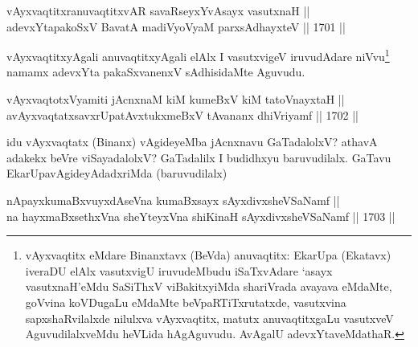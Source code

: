 \begin{shl}
vAyxvaqtitxranuvaqtitxvAR savaRseyxYvAsayx vasutxnaH || \\
adevxYtapakoSxV BavatA madiVyoV\s yaM parxsAdhayxteV \hfill || 1701 ||  
\end{shl}

\begin{artha}
vAyxvaqtitxyAgali anuvaqtitxyAgali elAlx I vasutxvigeV iruvudAdare niVvu\footnote{vAyxvaqtitx eMdare Binanxtavx (BeVda) anuvaqtitx: EkarUpa (Ekatavx) iveraDU elAlx vasutxvigU iruvudeMbudu iSaTxvAdare `asayx vasutxnaH'eMdu SaSiThxV viBakitxyiMda shariVrada avayava eMdaMte, goVvina koVDugaLu eMdaMte beVpaRTiTxrutatxde, vasutxvina sapxshaRvilalxde nilulxva vAyxvaqtitx, matutx anuvaqtitxgaLu vasutxveV AguvudilalxveMdu heVLida hAgAguvudu. AvAgalU adevxYtaveMdathaR.} namamx adevxYta pakaSxvanenxV sAdhisidaMte Aguvudu.
\end{artha}

\begin{shl}
\footnotemark[2]vAyxvaqtotxV\s yamiti jAcnxnaM kiM kumeBxV kiM tatoV\s nayxtaH ||  \\
avAyxvaqtatxsavxrUpatAvxtukxmeBxV tAvananx dhiVriyamf \hfill || 1702 ||  
\end{shl}

\begin{artha}
idu vAyxvaqtatx (Binanx) vAgideyeMba jAcnxnavu GaTadalolxV? athavA adakekx beVre viSayadalolxV? GaTadalilx I budidhxyu baruvudilalx. GaTavu EkarUpavAgideyAdadxriMda (baruvudilalx)
\end{artha}

\begin{shl}
\footnotemark[3]nApayxkumaBxvuyxdAseVna kumaBxsayx sAyxdivxsheVSaNamf || \\
na hayxmaBxsethxVna sheYteyxVna shiKinaH sAyxdivxsheVSaNamf \hfill || 1703 ||  
\end{shl}

